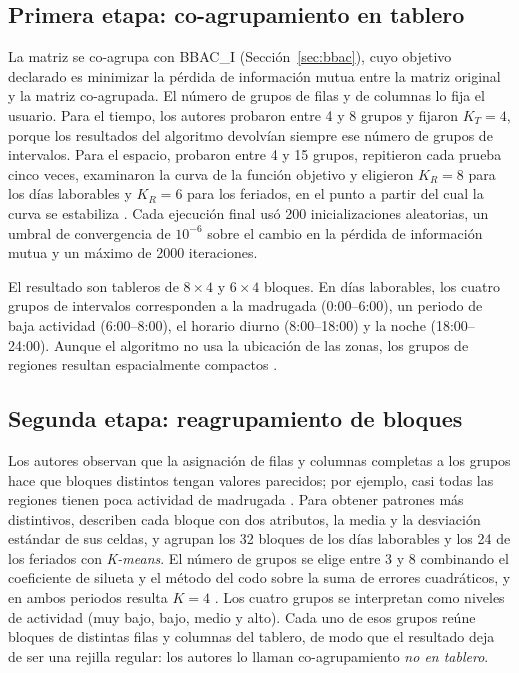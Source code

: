 \subsection{Primera etapa: co-agrupamiento en tablero}

La matriz se co-agrupa con BBAC\_I (Sección~\ref{sec:bbac}), cuyo objetivo
declarado es minimizar la pérdida de información mutua entre la matriz original y
la matriz co-agrupada. El número de grupos de filas y de columnas lo fija el
usuario. Para el tiempo, los autores probaron entre 4 y 8 grupos y fijaron
$K_T = 4$, porque los resultados del algoritmo devolvían siempre ese número de
grupos de intervalos.
Para el espacio, probaron entre 4 y 15 grupos, repitieron cada prueba cinco veces,
examinaron la curva de la función objetivo y eligieron $K_R = 8$ para los días
laborables y $K_R = 6$ para los feriados, en el punto a partir del cual la curva
se estabiliza \cite[Sec.~IV.B]{Liu2021}. Cada ejecución final usó 200
inicializaciones aleatorias, un umbral de convergencia de $10^{-6}$ sobre el
cambio en la pérdida de información mutua y un máximo de 2000 iteraciones.

El resultado son tableros de $8 \times 4$ y $6 \times 4$ bloques. En días
laborables, los cuatro grupos de intervalos corresponden a la madrugada
(0:00--6:00), un periodo de baja actividad (6:00--8:00), el horario diurno
(8:00--18:00) y la noche (18:00--24:00). Aunque el algoritmo no usa la ubicación de
las zonas, los grupos de regiones resultan espacialmente compactos
\cite[Sec.~IV.C]{Liu2021}.

\subsection{Segunda etapa: reagrupamiento de bloques}

Los autores observan que la asignación de filas y columnas completas a los grupos
hace que bloques distintos tengan valores parecidos; por ejemplo, casi todas las
regiones tienen poca actividad de madrugada \cite[Sec.~III.B]{Liu2021}. Para
obtener patrones más distintivos, describen cada bloque con dos atributos, la
media y la desviación estándar de sus celdas, y agrupan los 32 bloques de los
días laborables y los 24 de los feriados con \textit{K-means}. El número de
grupos se elige entre 3 y 8 combinando el coeficiente de silueta y el método del
codo sobre la suma de errores cuadráticos, y en ambos periodos resulta $K = 4$
\cite[Sec.~IV.D]{Liu2021}. Los cuatro grupos se interpretan como niveles de
actividad (muy bajo, bajo, medio y alto). Cada uno de esos grupos reúne bloques
de distintas filas y columnas del tablero, de modo que el resultado deja de ser
una rejilla regular: los autores lo llaman co-agrupamiento \emph{no en tablero}.

